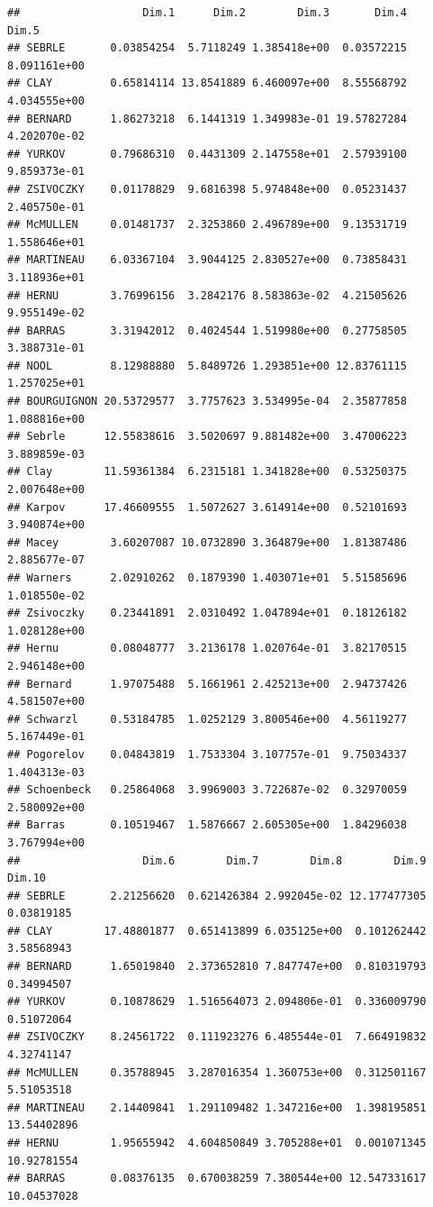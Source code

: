 \documentclass[
]{book}
\begin{document}
\begin{verbatim}
##                   Dim.1      Dim.2        Dim.3       Dim.4        Dim.5
## SEBRLE       0.03854254  5.7118249 1.385418e+00  0.03572215 8.091161e+00
## CLAY         0.65814114 13.8541889 6.460097e+00  8.55568792 4.034555e+00
## BERNARD      1.86273218  6.1441319 1.349983e-01 19.57827284 4.202070e-02
## YURKOV       0.79686310  0.4431309 2.147558e+01  2.57939100 9.859373e-01
## ZSIVOCZKY    0.01178829  9.6816398 5.974848e+00  0.05231437 2.405750e-01
## McMULLEN     0.01481737  2.3253860 2.496789e+00  9.13531719 1.558646e+01
## MARTINEAU    6.03367104  3.9044125 2.830527e+00  0.73858431 3.118936e+01
## HERNU        3.76996156  3.2842176 8.583863e-02  4.21505626 9.955149e-02
## BARRAS       3.31942012  0.4024544 1.519980e+00  0.27758505 3.388731e-01
## NOOL         8.12988880  5.8489726 1.293851e+00 12.83761115 1.257025e+01
## BOURGUIGNON 20.53729577  3.7757623 3.534995e-04  2.35877858 1.088816e+00
## Sebrle      12.55838616  3.5020697 9.881482e+00  3.47006223 3.889859e-03
## Clay        11.59361384  6.2315181 1.341828e+00  0.53250375 2.007648e+00
## Karpov      17.46609555  1.5072627 3.614914e+00  0.52101693 3.940874e+00
## Macey        3.60207087 10.0732890 3.364879e+00  1.81387486 2.885677e-07
## Warners      2.02910262  0.1879390 1.403071e+01  5.51585696 1.018550e-02
## Zsivoczky    0.23441891  2.0310492 1.047894e+01  0.18126182 1.028128e+00
## Hernu        0.08048777  3.2136178 1.020764e-01  3.82170515 2.946148e+00
## Bernard      1.97075488  5.1661961 2.425213e+00  2.94737426 4.581507e+00
## Schwarzl     0.53184785  1.0252129 3.800546e+00  4.56119277 5.167449e-01
## Pogorelov    0.04843819  1.7533304 3.107757e-01  9.75034337 1.404313e-03
## Schoenbeck   0.25864068  3.9969003 3.722687e-02  0.32970059 2.580092e+00
## Barras       0.10519467  1.5876667 2.605305e+00  1.84296038 3.767994e+00
##                   Dim.6        Dim.7        Dim.8        Dim.9      Dim.10
## SEBRLE       2.21256620  0.621426384 2.992045e-02 12.177477305  0.03819185
## CLAY        17.48801877  0.651413899 6.035125e+00  0.101262442  3.58568943
## BERNARD      1.65019840  2.373652810 7.847747e+00  0.810319793  0.34994507
## YURKOV       0.10878629  1.516564073 2.094806e-01  0.336009790  0.51072064
## ZSIVOCZKY    8.24561722  0.111923276 6.485544e-01  7.664919832  4.32741147
## McMULLEN     0.35788945  3.287016354 1.360753e+00  0.312501167  5.51053518
## MARTINEAU    2.14409841  1.291109482 1.347216e+00  1.398195851 13.54402896
## HERNU        1.95655942  4.604850849 3.705288e+01  0.001071345 10.92781554
## BARRAS       0.08376135  0.670038259 7.380544e+00 12.547331617 10.04537028

\end{verbatim}
\end{document}
